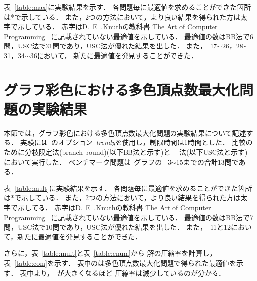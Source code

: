 表~\ref{table:max}に実験結果を示す．
各問題毎に最適値を求めることができた箇所は*で示している．
また，2つの方法において，より良い結果を得られた方は太字で示している．
赤字はD.~E~.Knuthの教科書
The Art of Computer Programming~\cite{Knuth:TAOCP:SAT}
に記載されていない最適値を示している．
最適値の数はBB法で6問，USC法で31問であり，USC法が優れた結果を出した．
また，~17$\sim$26，28$\sim$31，34$\sim$36において，
新たに最適値を発見することができた．

\section{グラフ彩色における多色頂点数最大化問題の実験結果}

本節では，グラフ彩色における多色頂点数最大化問題の実験結果について記述する．
実験には~{\clingo}のオプション~\textit{trendy}を使用し，制限時間は1時間とした．
比較のために分枝限定法(branch bound)(以下BB法と示す)と
~~法(以下USC法と示す)において実行した．
ベンチマーク問題は~グラフの
~3$\sim$15までの合計13問である．

表~\ref{table:mult}に実験結果を示す．
各問題毎に最適値を求めることができた箇所は*で示している．
また，2つの方法において，より良い結果を得られた方は太字で示してる．
赤字はD.~E~.Knuthの教科書
The Art of Computer Programming~\cite{Knuth:TAOCP:SAT}
に記載されていない最適値を示している．
最適値の数はBB法で7問，USC法で10問であり，USC法が優れた結果を出した．
また，~11と12において，新たに最適値を発見することができた．

さらに，表~\ref{table:mult}と表~\ref{table:enum}から
解の圧縮率を計算し，表~\ref{table:com}を示す．
表中のは多色頂点数最大化問題で得られた最適値を示す．
表中より，~が大きくなるほど
圧縮率は減少しているのが分かる．



